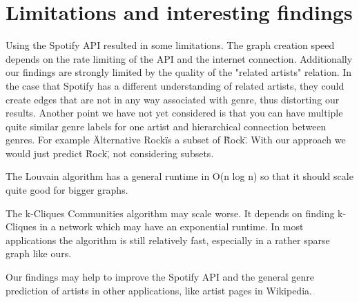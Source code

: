 \documentclass[11pt,a4paper,onecolumn,notitlepage]{article}
\begin{document}
\section{Limitations and interesting findings}
Using the Spotify API resulted in some limitations. The graph creation speed depends on the rate limiting of the API and the internet connection. Additionally our findings are strongly limited by the quality of the "related artists" relation. In the case that Spotify has a different understanding of related artists, they could create edges that are not in any way associated with genre, thus distorting our results. Another point we have not yet considered is that you can have multiple quite similar genre labels for one artist and hierarchical connection between genres. For example \"Alternative Rock\" is a subset of \"Rock\". With our approach we would just predict \"Rock\", not considering subsets.

The Louvain algorithm has a general runtime in O(n log n) so that it should scale quite good for bigger graphs.

The k-Cliques Communities algorithm may scale worse. It depends on finding k-Cliques in a network which may have an exponential runtime. In most applications the algorithm is still relatively fast, especially in a rather sparse graph like ours.

Our findings may help to improve the Spotify API and the general genre prediction of artists in other applications, like artist pages in Wikipedia.




  
\end{document}
